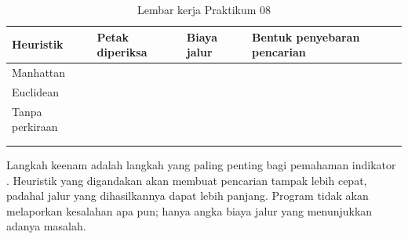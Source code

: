 \begin{table}[htbp]
\centering
\caption{Lembar kerja Praktikum 08}
\label{tab:lembar-praktikum-08}
{\setlength{\tabcolsep}{4pt}\footnotesize%
\begin{tabularx}{\textwidth}{@{}C{3.0cm} C{2.6cm} C{2.4cm} Y@{}}
\toprule
\headrow \textbf{Heuristik} & \textbf{Petak diperiksa} & \textbf{Biaya jalur} & \textbf{Bentuk penyebaran pencarian} \\
\midrule
Manhattan & & & \\[1.4em]
\addlinespace
Euclidean & & & \\[1.4em]
\addlinespace
Tanpa perkiraan & & & \\[1.4em]
\addlinespace
{} \\[1.4em]
\addlinespace
{} \\[1.4em]
\bottomrule
\end{tabularx}}
\end{table}

\begin{catatabox}
Langkah keenam adalah langkah yang paling penting bagi pemahaman indikator
. Heuristik yang digandakan akan membuat pencarian tampak lebih cepat,
padahal jalur yang dihasilkannya dapat lebih panjang. Program
tidak akan melaporkan kesalahan apa pun; hanya angka biaya jalur yang
menunjukkan adanya masalah.
\end{catatabox}
